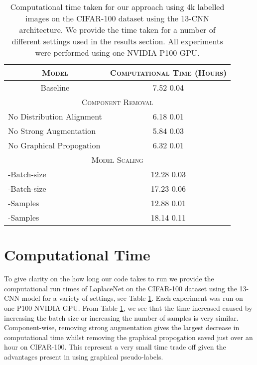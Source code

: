 \documentclass[journal]{IEEEtran}
\begin{document}
\begin{table}[t!]
    \centering
    \caption{Computational time taken for our approach using 4k labelled images on the CIFAR-100 dataset using the 13-CNN architecture. We provide the time taken for a number of different settings used in the results section. All experiments were performed using one NVIDIA P100 GPU.}
    \begin{tabular}{|cc|} \hline
       \multicolumn{1}{|c}{\cellcolor{gray!25} \textsc{Model}}   & \multicolumn{1}{|c|}{\cellcolor{gray!25} \textsc{Computational Time (Hours)}}  \\ \hline
      \multicolumn{1}{|c}{Baseline}  & \multicolumn{1}{|c|}{\textsc{7.52  0.04 }}  \\  \hline
       \multicolumn{2}{|c|}{\cellcolor{gray!25} \textsc{Component Removal}} \\ \hline
       \multicolumn{1}{|l|}{No Distribution Alignment} & 6.18  0.01  \\
       \multicolumn{1}{|l|}{No Strong Augmentation} &  5.84  0.03 \\ 
       \multicolumn{1}{|l|}{No Graphical Propogation} & 6.32  0.01  \\ \hline
       \multicolumn{2}{|c|}{\cellcolor{gray!25}\textsc{Model Scaling}} \\ \hline
       
       \multicolumn{1}{|l|}{-Batch-size} & 12.28  0.03  \\
       \multicolumn{1}{|l|}{-Batch-size} & 17.23  0.06 \\ 
       \multicolumn{1}{|l|}{-Samples} & 12.88  0.01  \\
       \multicolumn{1}{|l|}{-Samples} &  18.14  0.11 \\ \hline
       
       
    \end{tabular}
    \label{tab:computational_time}
\end{table}

\section{Computational Time}
To give clarity on the how long our code takes to run we provide the computational run times of LaplaceNet on the CIFAR-100 dataset using the 13-CNN model for a variety of settings, see Table \ref{tab:computational_time}. Each experiment was run on one P100 NVIDIA GPU. From Table \ref{tab:computational_time}, we see that the time increased caused by increasing the batch size or increasing the number of samples is very similar. Component-wise, removing strong augmentation gives the largest decrease in computational time whilst removing the graphical propogation saved just over an hour on CIFAR-100. This represent a very small time trade off given the advantages present in using graphical pseudo-labels. 
\end{document}
